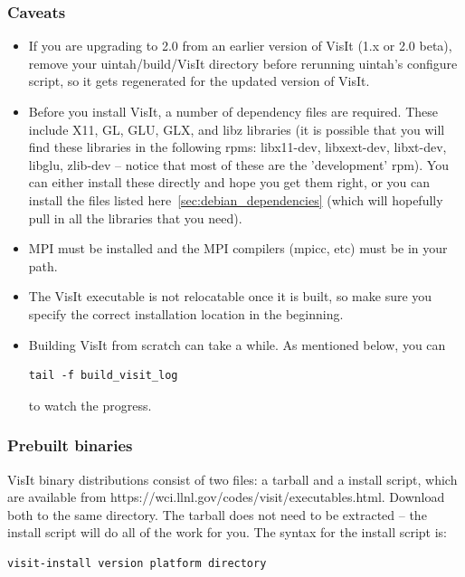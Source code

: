 \documentclass[12pt]{article}
\begin{document}
\subsubsection{Caveats}
\label{subsec:VisIt_Caveats}
\begin{itemize}
\item If you are upgrading to 2.0 from an earlier version of VisIt
  (1.x or 2.0 beta), remove your uintah/build/VisIt directory before
  rerunning uintah's configure script, so it gets regenerated for
  the updated version of VisIt.
\item Before you install VisIt, a number of dependency files are
  required.  These include X11, GL, GLU, GLX, and libz libraries (it is possible
  that you will find these libraries in the following rpms:
  libx11-dev, libxext-dev, libxt-dev, libglu, zlib-dev -- notice that
  most of these are the 'development' rpm).  You can either install
  these directly and hope you get them right, or you can install the
  files listed here~\ref{sec:debian_dependencies} (which will
  hopefully pull in all the libraries that you need).
\item MPI must be installed and the MPI compilers (mpicc, etc) must be
  in your path.
\item The VisIt executable is not relocatable once it is built, so
  make sure you specify the correct installation location in the
  beginning.
\item Building VisIt from scratch can take a while.  As mentioned
  below, you can \begin{verbatim}tail -f build_visit_log\end{verbatim}
  to watch the progress.

\end{itemize}

\subsubsection{Prebuilt binaries}
\label{subsec:PrebuiltBinaries}

VisIt binary distributions consist of two files: a tarball and a install script,
which are available from https://wci.llnl.gov/codes/visit/executables.html.  Download
both to the same directory.  The tarball does not need to be extracted -- the 
install script will do all of the work for you.  The syntax for the install script is:
\begin{verbatim}
visit-install version platform directory
\end{verbatim}
\end{document}
